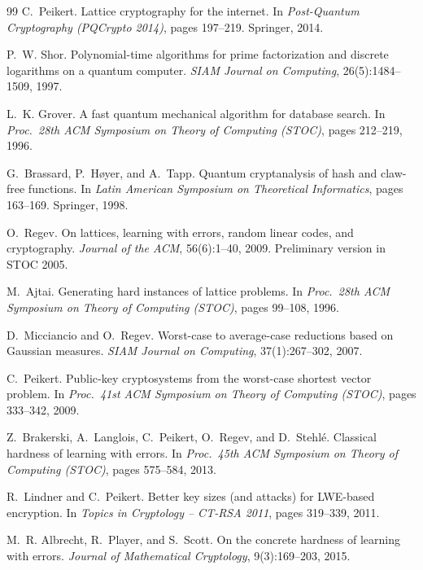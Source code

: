 \begin{thebibliography}{99}
 C.~Peikert.
\newblock Lattice cryptography for the internet.
\newblock In \emph{Post-Quantum Cryptography (PQCrypto 2014)}, pages 197--219. Springer, 2014.

 P.~W. Shor.
\newblock Polynomial-time algorithms for prime factorization and discrete logarithms on a quantum computer.
\newblock \emph{SIAM Journal on Computing}, 26(5):1484--1509, 1997.

 L.~K. Grover.
\newblock A fast quantum mechanical algorithm for database search.
\newblock In \emph{Proc.\ 28th ACM Symposium on Theory of Computing (STOC)}, pages 212--219, 1996.

 G.~Brassard, P.~H\o yer, and A.~Tapp.
\newblock Quantum cryptanalysis of hash and claw-free functions.
\newblock In \emph{Latin American Symposium on Theoretical Informatics}, pages 163--169. Springer, 1998.

 O.~Regev.
\newblock On lattices, learning with errors, random linear codes, and cryptography.
\newblock \emph{Journal of the ACM}, 56(6):1--40, 2009. Preliminary version in STOC 2005.

 M.~Ajtai.
\newblock Generating hard instances of lattice problems.
\newblock In \emph{Proc.\ 28th ACM Symposium on Theory of Computing (STOC)}, pages 99--108, 1996.

 D.~Micciancio and O.~Regev.
\newblock Worst-case to average-case reductions based on Gaussian measures.
\newblock \emph{SIAM Journal on Computing}, 37(1):267--302, 2007.

 C.~Peikert.
\newblock Public-key cryptosystems from the worst-case shortest vector problem.
\newblock In \emph{Proc.\ 41st ACM Symposium on Theory of Computing (STOC)}, pages 333--342, 2009.

 Z.~Brakerski, A.~Langlois, C.~Peikert, O.~Regev, and D.~Stehl\'{e}.
\newblock Classical hardness of learning with errors.
\newblock In \emph{Proc.\ 45th ACM Symposium on Theory of Computing (STOC)}, pages 575--584, 2013.

 R.~Lindner and C.~Peikert.
\newblock Better key sizes (and attacks) for LWE-based encryption.
\newblock In \emph{Topics in Cryptology -- CT-RSA 2011}, pages 319--339, 2011.

 M.~R. Albrecht, R.~Player, and S.~Scott.
\newblock On the concrete hardness of learning with errors.
\newblock \emph{Journal of Mathematical Cryptology}, 9(3):169--203, 2015.


\end{thebibliography}
